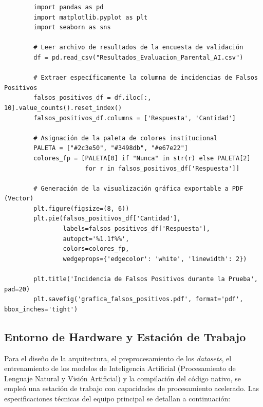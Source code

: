 \begin{listing}[H]
    \caption{Fragmento de código para el análisis de la matriz de respuestas y generación de gráficas con Seaborn}
    \label{cod:anexo-graficas-analisis}
    \begin{verbatim}
        import pandas as pd
        import matplotlib.pyplot as plt
        import seaborn as sns

        # Leer archivo de resultados de la encuesta de validación
        df = pd.read_csv("Resultados_Evaluacion_Parental_AI.csv")

        # Extraer específicamente la columna de incidencias de Falsos Positivos
        falsos_positivos_df = df.iloc[:, 10].value_counts().reset_index()
        falsos_positivos_df.columns = ['Respuesta', 'Cantidad']

        # Asignación de la paleta de colores institucional
        PALETA = ["#2c3e50", "#3498db", "#e67e22"]
        colores_fp = [PALETA[0] if "Nunca" in str(r) else PALETA[2] 
                      for r in falsos_positivos_df['Respuesta']]

        # Generación de la visualización gráfica exportable a PDF (Vector)
        plt.figure(figsize=(8, 6))
        plt.pie(falsos_positivos_df['Cantidad'], 
                labels=falsos_positivos_df['Respuesta'], 
                autopct='%1.1f%%', 
                colors=colores_fp, 
                wedgeprops={'edgecolor': 'white', 'linewidth': 2})
                
        plt.title('Incidencia de Falsos Positivos durante la Prueba', pad=20)
        plt.savefig('grafica_falsos_positivos.pdf', format='pdf', bbox_inches='tight')
    \end{verbatim}
\end{listing}

\subsection{Entorno de Hardware y Estación de Trabajo}
Para el diseño de la arquitectura, el preprocesamiento de los \textit{datasets}, el entrenamiento de los modelos de Inteligencia Artificial (Procesamiento de Lenguaje Natural y Visión Artificial) y la compilación del código nativo, se empleó una estación de trabajo con capacidades de procesamiento acelerado. Las especificaciones técnicas del equipo principal se detallan a continuación:

